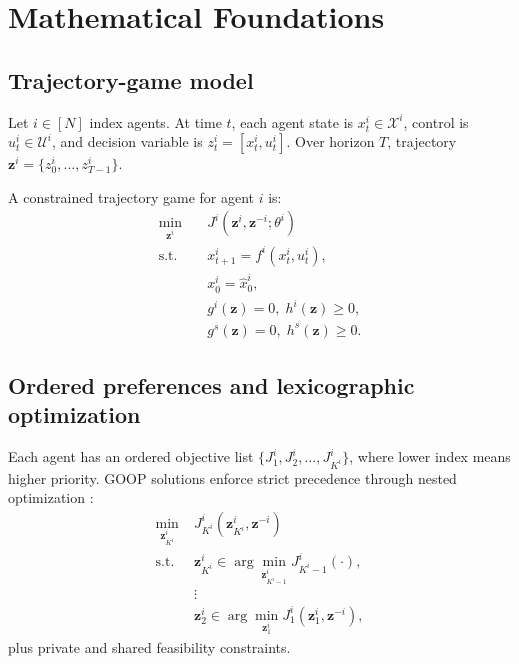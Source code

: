 \chapter{Mathematical Foundations}

\section{Trajectory-game model}

Let $i \in [N]$ index agents. At time $t$, each agent state is
$x_t^i \in \mathcal{X}^i$, control is $u_t^i \in \mathcal{U}^i$, and decision
variable is $z_t^i = [x_t^i, u_t^i]$. Over horizon $T$, trajectory
$\mathbf{z}^i = \{z_0^i,\dots,z_{T-1}^i\}$.

A constrained trajectory game for agent $i$ is:
\begin{equation}
\begin{aligned}
\min_{\mathbf{z}^i} \quad & J^i(\mathbf{z}^i,\mathbf{z}^{-i};\theta^i) \\
\text{s.t.}\quad & x_{t+1}^i = f^i(x_t^i,u_t^i), \\
& x_0^i = \hat{x}_0^i, \\
& g^i(\mathbf{z})=0,\; h^i(\mathbf{z})\ge0, \\
& g^s(\mathbf{z})=0,\; h^s(\mathbf{z})\ge0.
\end{aligned}
\label{eq:traj_game_foundation}
\end{equation}

\section{Ordered preferences and lexicographic optimization}

Each agent has an ordered objective list
$\{J_1^i, J_2^i, \dots, J_{K^i}^i\}$, where lower index means higher priority.
GOOP solutions enforce strict precedence through nested optimization
\cite{lee:2025}:
\begin{equation}
\begin{aligned}
\min_{\mathbf{z}_{K^i}^i} \;& J_{K^i}^i(\mathbf{z}_{K^i}^i,\mathbf{z}^{-i}) \\
\text{s.t.}\;& \mathbf{z}_{K^i}^i \in \arg\min_{\mathbf{z}_{K^i-1}^i} J_{K^i-1}^i(\cdot), \\
& \vdots \\
& \mathbf{z}_2^i \in \arg\min_{\mathbf{z}_1^i} J_1^i(\mathbf{z}_1^i,\mathbf{z}^{-i}),
\end{aligned}
\label{eq:goop_nested_foundation}
\end{equation}
plus private and shared feasibility constraints.

